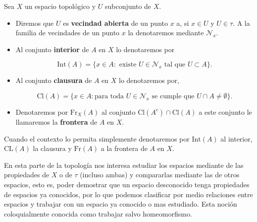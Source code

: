 \begin{df}
Sea $X$ un espacio topológico y $U$ subconjunto de $X$.

\begin{itemize}
	\item Diremos que $U$ es \textbf{vecindad abierta} de un punto $x$ a, si $x \in U$ y $U \in \tau$. A la familia de vecindades de un punto $x$ la denotaremos mediante $\mathcal{N}_x$.
	\item Al conjunto \textbf{interior} de $A$ en $X$ lo denotaremos por 
 
  $$\mathrm{Int}(A)=\{x \in A: \text{ existe } U \in \mathcal{N}_x \text{ tal que } U \subset A\}.$$
  
	\item  Al conjunto  \textbf{clausura} de $A$ en $X$ lo denotaremos por, 
  
$$\mathrm{Cl}(A)=\{x \in A: \text{para toda } U \in \mathcal{N}_x \text{ se cumple  que } U \cap A \neq \emptyset\}.$$
	
	\item Denotaremos por  $\mathrm{Fr}_X(A)$ al conjunto $\mathrm{Cl}(A^c) \cap \mathrm{Cl}(A) $ a este conjunto le llamaremos la 
  \textbf{frontera} de $A$ en $X$.
 \end{itemize}
\end{df}


\begin{cn}
Cuando el contexto lo permita simplemente denotaremos por $\mathrm{Int}(A)$ al interior, $\mathrm{CL}(A)$ la clausura y  $\mathrm{Fr}(A)$ a la frontera de $A$ en $X$.
\end{cn}


En esta parte de la topología nos interesa estudiar los espacios mediante de las propiedades de $X$ o de $\tau$ (incluso ambas) y compararlas mediante las de otros espacios, esto es, poder demostrar que un espacio desconocido tenga propiedades de espacios ya conocidos, por lo que podemos clasificar por medio relaciones entre espacios y trabajar con un espacio ya conocido o mas estudiado. Esta noción coloquialmente conocida como trabajar salvo homeomorfismo. 

